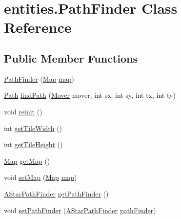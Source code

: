 \hypertarget{classentities_1_1_path_finder}{}\section{entities.\+Path\+Finder Class Reference}
\label{classentities_1_1_path_finder}
\subsection*{Public Member Functions}
\begin{DoxyCompactItemize}
\item 
\mbox{\hyperlink{classentities_1_1_path_finder_afcf6c2098929ad2f90bcc34875a0902f}{Path\+Finder}} (\mbox{\hyperlink{classentities_1_1_map}{Map}} \mbox{\hyperlink{classentities_1_1_path_finder_a55024473615fc2ba75d7faf5dcd78b3f}{map}})
\item 
\mbox{\hyperlink{classorg_1_1newdawn_1_1slick_1_1util_1_1pathfinding_1_1_path}{Path}} \mbox{\hyperlink{classentities_1_1_path_finder_a392069295c51a6b5470585f2f956a226}{find\+Path}} (\mbox{\hyperlink{interfaceorg_1_1newdawn_1_1slick_1_1util_1_1pathfinding_1_1_mover}{Mover}} mover, int sx, int sy, int tx, int ty)
\item 
void \mbox{\hyperlink{classentities_1_1_path_finder_a43344b26144ea29f390b8be84f14ee7a}{reinit}} ()
\item 
int \mbox{\hyperlink{classentities_1_1_path_finder_a35e329ef378f48050d49408140412e7f}{get\+Tile\+Width}} ()
\item 
int \mbox{\hyperlink{classentities_1_1_path_finder_a3193394c83000018da44409a33f8720c}{get\+Tile\+Height}} ()
\item 
\mbox{\hyperlink{classentities_1_1_map}{Map}} \mbox{\hyperlink{classentities_1_1_path_finder_a130df479b259cdc0904207301454dc2f}{get\+Map}} ()
\item 
void \mbox{\hyperlink{classentities_1_1_path_finder_a20d8d7bca113f2a92740b00fb5c8f6ee}{set\+Map}} (\mbox{\hyperlink{classentities_1_1_map}{Map}} \mbox{\hyperlink{classentities_1_1_path_finder_a55024473615fc2ba75d7faf5dcd78b3f}{map}})
\item 
\mbox{\hyperlink{classorg_1_1newdawn_1_1slick_1_1util_1_1pathfinding_1_1_a_star_path_finder}{A\+Star\+Path\+Finder}} \mbox{\hyperlink{classentities_1_1_path_finder_a25a38e5f0d878079b9fde1260dc5074a}{get\+Path\+Finder}} ()
\item 
void \mbox{\hyperlink{classentities_1_1_path_finder_acf5f6e67e696814ab392055be456af7a}{set\+Path\+Finder}} (\mbox{\hyperlink{classorg_1_1newdawn_1_1slick_1_1util_1_1pathfinding_1_1_a_star_path_finder}{A\+Star\+Path\+Finder}} \mbox{\hyperlink{classentities_1_1_path_finder_a3ee55002f6ed410109207b43757e93f7}{path\+Finder}})
\end{DoxyCompactItemize}

